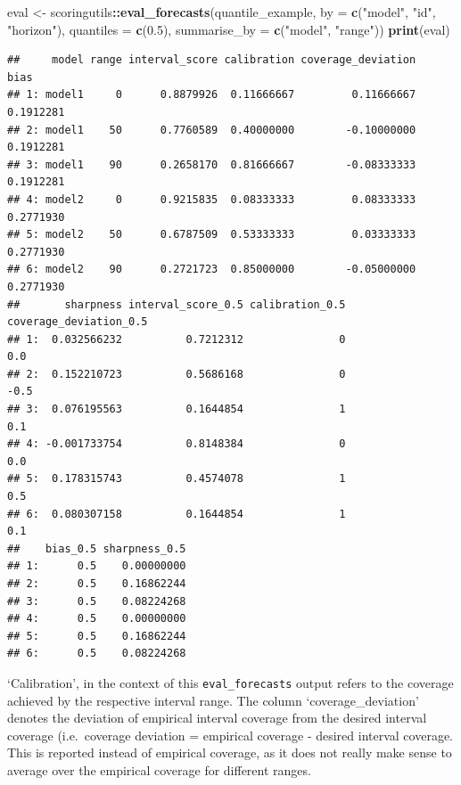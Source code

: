 \documentclass[
]{book}
\newenvironment{Shaded}{\begin{snugshade}}{\end{snugshade}}
\newcommand{\DataTypeTok}[1]{\textcolor[rgb]{0.13,0.29,0.53}{#1}}
\newcommand{\FloatTok}[1]{\textcolor[rgb]{0.00,0.00,0.81}{#1}}
\newcommand{\KeywordTok}[1]{\textcolor[rgb]{0.13,0.29,0.53}{\textbf{#1}}}
\newcommand{\NormalTok}[1]{#1}
\newcommand{\OperatorTok}[1]{\textcolor[rgb]{0.81,0.36,0.00}{\textbf{#1}}}
\newcommand{\StringTok}[1]{\textcolor[rgb]{0.31,0.60,0.02}{#1}}
\begin{document}
\begin{Shaded}
\begin{Highlighting}[]
\NormalTok{eval \textless{}{-}}\StringTok{ }\NormalTok{scoringutils}\OperatorTok{::}\KeywordTok{eval\_forecasts}\NormalTok{(quantile\_example, }
                                     \DataTypeTok{by =} \KeywordTok{c}\NormalTok{(}\StringTok{"model"}\NormalTok{, }\StringTok{"id"}\NormalTok{, }\StringTok{"horizon"}\NormalTok{), }
                                     \DataTypeTok{quantiles =} \KeywordTok{c}\NormalTok{(}\FloatTok{0.5}\NormalTok{),}
                                     \DataTypeTok{summarise\_by =} \KeywordTok{c}\NormalTok{(}\StringTok{"model"}\NormalTok{, }\StringTok{"range"}\NormalTok{))}
\KeywordTok{print}\NormalTok{(eval)}
\end{Highlighting}
\end{Shaded}

\begin{verbatim}
##     model range interval_score calibration coverage_deviation      bias
## 1: model1     0      0.8879926  0.11666667         0.11666667 0.1912281
## 2: model1    50      0.7760589  0.40000000        -0.10000000 0.1912281
## 3: model1    90      0.2658170  0.81666667        -0.08333333 0.1912281
## 4: model2     0      0.9215835  0.08333333         0.08333333 0.2771930
## 5: model2    50      0.6787509  0.53333333         0.03333333 0.2771930
## 6: model2    90      0.2721723  0.85000000        -0.05000000 0.2771930
##       sharpness interval_score_0.5 calibration_0.5 coverage_deviation_0.5
## 1:  0.032566232          0.7212312               0                    0.0
## 2:  0.152210723          0.5686168               0                   -0.5
## 3:  0.076195563          0.1644854               1                    0.1
## 4: -0.001733754          0.8148384               0                    0.0
## 5:  0.178315743          0.4574078               1                    0.5
## 6:  0.080307158          0.1644854               1                    0.1
##    bias_0.5 sharpness_0.5
## 1:      0.5    0.00000000
## 2:      0.5    0.16862244
## 3:      0.5    0.08224268
## 4:      0.5    0.00000000
## 5:      0.5    0.16862244
## 6:      0.5    0.08224268
\end{verbatim}

`Calibration', in the context of this \texttt{eval\_forecasts} output refers to the coverage achieved by the respective interval range. The column `coverage\_deviation' denotes the deviation of empirical interval coverage from the desired interval coverage (i.e.~coverage deviation = empirical coverage - desired interval coverage. This is reported instead of empirical coverage, as it does not really make sense to average over the empirical coverage for different ranges.
\end{document}
